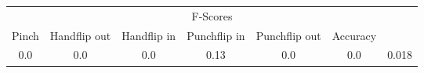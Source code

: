 \documentclass{standalone}
\begin{document}
 
 \begin{tabular}{|c|c|c|c|c|c ||c|}
\cline{1-7}\multicolumn{7}{|c|}{F-Scores} \\ 
\cline{1-7}Pinch & Handflip out & Handflip in & Punchflip in & Punchflip out & Accuracy\\ 
\cline{1-7}0.0 & 0.0 & 0.0 & 0.13 & 0.0 & 0.0 & 0.018\\ 
 \cline{1-7}\hline \end{tabular}
 
\end{document}
